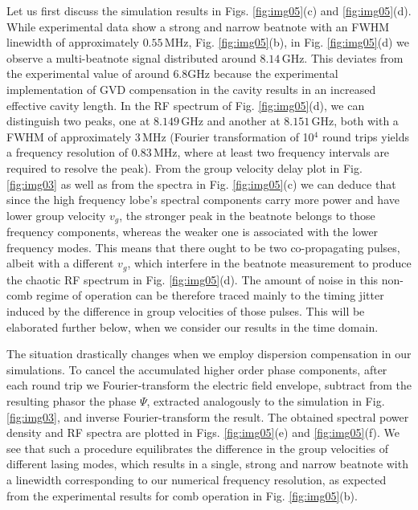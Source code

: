 \documentclass[10pt]{article}
\begin{document}
	Let us first discuss the simulation results in Figs. \ref{fig:img05}(c) and \ref{fig:img05}(d). While
	experimental data show a strong and narrow beatnote with an FWHM linewidth of
	approximately $0.55{\,}\mathrm{MHz}$, Fig. \ref{fig:img05}(b), in Fig.
	\ref{fig:img05}(d) we observe a multi-beatnote signal distributed around
	$8.14{\,}\mathrm{GHz}$. This deviates from the experimental value of
	around $6.8${\thinspace}$\mathrm{GHz}$ because the experimental
	implementation of GVD compensation in the cavity results in an increased
	effective cavity length. In the RF spectrum of Fig. \ref{fig:img05}(d), we can
	distinguish two peaks, one at $8.149{\,}\mathrm{GHz}$ and another at
	$8.151{\,}\mathrm{GHz}$, both with a FWHM of approximately $3{\,}%
	\mathrm{MHz}$ (Fourier transformation of 10$^{4}$ round trips yields a
	frequency resolution of $0.83{\,}\mathrm{MHz}$, where at least two frequency
	intervals are required to resolve the peak). From the group velocity delay
	plot in Fig. \ref{fig:img03} as well as from the spectra in Fig.
	\ref{fig:img05}(c) we can deduce that since the high frequency lobe's spectral
	components carry more power and have lower group velocity $v_{g}$, the
	stronger peak in the beatnote belongs to those frequency components, whereas
	the weaker one is associated with the lower frequency modes. This means that
	there ought to be two co-propagating pulses, albeit with a different $v_{g}$,
	which interfere in the beatnote measurement to produce the chaotic RF spectrum
	in Fig. \ref{fig:img05}(d). The amount of noise in this non-comb regime of
	operation can be therefore traced mainly to the timing jitter induced by the
	difference in group velocities of those pulses. This will be elaborated
	further below, when we consider our results in the time domain.
		
	The situation drastically changes when we employ dispersion compensation in
	our simulations. To cancel the accumulated higher order phase components,
	after each round trip we Fourier-transform the electric field envelope,
	subtract from the resulting phasor the phase $\Psi$, extracted analogously to the simulation
	in Fig. \ref{fig:img03}, and inverse Fourier-transform the result. The
	obtained spectral power density and RF spectra are plotted in Figs.
	\ref{fig:img05}(e) and \ref{fig:img05}(f). We see that such a procedure equilibrates the difference
	in the group velocities of different lasing modes, which results in a single, strong and narrow
	beatnote with a linewidth corresponding to our numerical frequency resolution, as expected from
	the experimental results for comb operation in Fig. \ref{fig:img05}(b).
	
\end{document}
